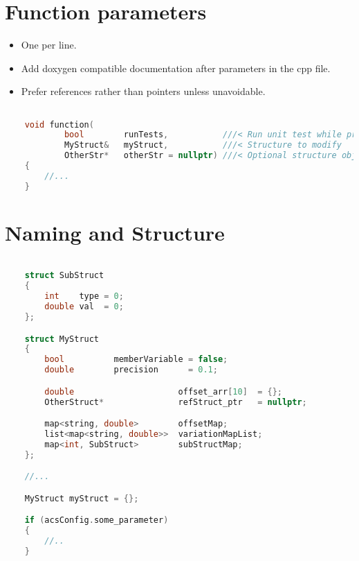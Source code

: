 \section{Function parameters}

\begin{itemize}
\item One per line.
\item Add doxygen compatible documentation after parameters in the cpp file.
\item Prefer references rather than pointers unless unavoidable.
\end{itemize}

\begin{lstlisting}[language=c++]

    void function(
            bool        runTests,           ///< Run unit test while processing
            MyStruct&   myStruct,           ///< Structure to modify
            OtherStr*	otherStr = nullptr)	///< Optional structure object to populate (cant use reference because its optional)
    {
    	//...
    }
\end{lstlisting}

\section{Naming and Structure}
\begin{lstlisting}[language=c++]

    struct SubStruct
    {
        int    type = 0;
        double val  = 0;
    };

    struct MyStruct
    {
        bool          memberVariable = false;
        double        precision      = 0.1;

        double                     offset_arr[10]  = {};
        OtherStruct*               refStruct_ptr   = nullptr;

        map<string, double>        offsetMap; 
        list<map<string, double>>  variationMapList;
        map<int, SubStruct>        subStructMap;
    };

    //...

    MyStruct myStruct = {};

    if (acsConfig.some_parameter)
    {
        //..
    }
\end{lstlisting}
